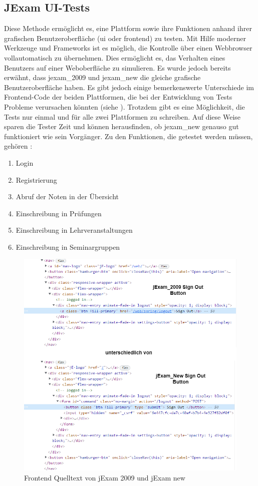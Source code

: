 \subsection{JExam UI-Tests}\label{subsec:jexam-ui-tests}

Diese Methode erm\"oglicht es, eine Plattform sowie ihre Funktionen anhand
ihrer grafischen Benutzeroberfl\"ache (\acs{ui} oder \gls{frontend}) zu
testen. Mit Hilfe moderner Werkzeuge und Frameworks ist es m\"oglich, die
Kontrolle \"uber einen Webbrowser vollautomatisch zu \"ubernehmen. Dies
erm\"oglicht es, das Verhalten eines Benutzers auf einer Weboberfl\"ache zu
simulieren. Es wurde jedoch bereits erw\"ahnt, dass \gls{jexam_2009} und \gls{jexam_new}
die gleiche grafische Benutzeroberfl\"ache haben. Es gibt jedoch einige
bemerkenswerte Unterschiede im Frontend-Code der beiden Plattformen,
die bei der Entwicklung von Tests Probleme verursachen k\"onnten
(siehe ). Trotzdem gibt es eine
M\"oglichkeit, die Tests nur einmal und f\"ur alle zwei
Plattformen zu schreiben. Auf diese Weise sparen die Tester Zeit und k\"onnen
herausfinden, ob \gls{jexam_new} genauso gut funktioniert wie sein Vorg\"anger. Zu den Funktionen, die getestet werden müssen, gehören :
\begin{enumerate}
    \item Login
    \item Registrierung
    \item Abruf der Noten in der Übersicht
    \item Einschreibung in Prüfungen
    \item Einschreibung in Lehrveranstaltungen
    \item Einschreibung in Seminargruppen
\end{enumerate}

\noindent
\begin{figure}[H]
    \centering
    \includegraphics[scale=0.5]{images/jexam_compare}
    \caption{Frontend Quelltext von jExam 2009 und jExam new} \label{fig:old_new}
\end{figure}

